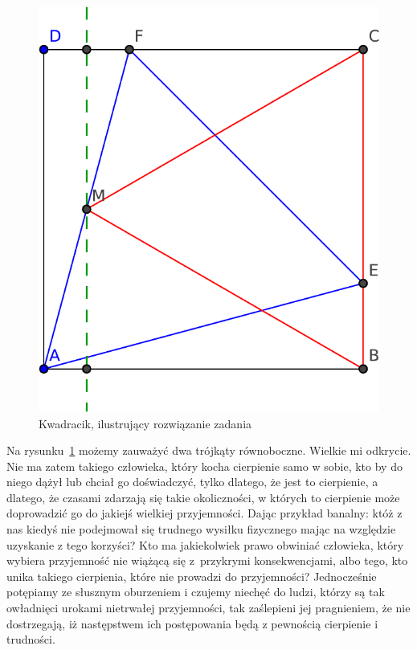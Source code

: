 \documentclass[12pt]{mwbk}
\theoremstyle{plain}
\theoremstyle{definition}
\theoremstyle{remark}
\newcommand\zrodlo[1]{\par\vspace{-3mm}{\small\textit{Źródło: }#1 }}
\begin{document}
\begin{figure}[htpb]
	\centering
		\includegraphics{rys/kwadracik.pdf}
	\caption{Kwadracik, ilustrujący rozwiązanie zadania}
	\label{fig:kwadracik}
	\zrodlo{\cite{Zenner2001}}
\end{figure}

Na rysunku~\ref{fig:kwadracik} możemy zauważyć dwa trójkąty równoboczne. Wielkie mi odkrycie.
Nie ma zatem takiego człowieka, który kocha cierpienie samo w sobie, 
kto by do niego dążył lub chciał go doświadczyć, tylko dlatego, że
jest to cierpienie, a dlatego, że czasami zdarzają się takie 
okoliczności, w których to cierpienie może doprowadzić 
go do jakiejś wielkiej przyjemności. 
Dając przykład banalny: któż z nas kiedyś nie podejmował 
się trudnego wysiłku fizycznego mając na względzie 
uzyskanie z tego korzyści? 
Kto ma jakiekolwiek prawo obwiniać człowieka, 
który wybiera przyjemność nie wiążącą się z~przykrymi 
konsekwencjami, albo tego, kto unika takiego cierpienia, 
które nie prowadzi do przyjemności? 
Jednocześnie potępiamy ze słusznym oburzeniem i czujemy 
niechęć do ludzi, którzy są tak owładnięci urokami nietrwałej 
przyjemności, tak zaślepieni jej pragnieniem, 
że nie dostrzegają, iż następstwem ich 
postępowania będą z pewnością cierpienie i trudności.
\end{document}
